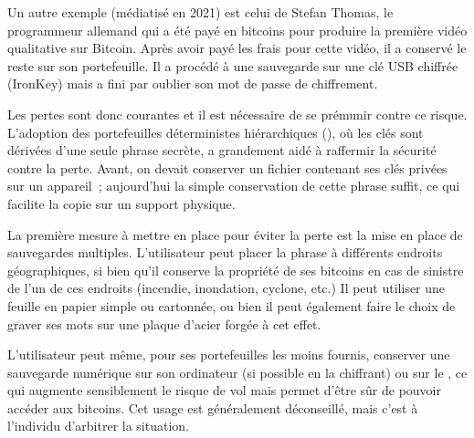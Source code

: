 Un autre exemple (médiatisé en 2021) est celui de Stefan Thomas, le programmeur allemand qui a été payé en bitcoins pour produire la première vidéo qualitative sur Bitcoin. Après avoir payé les frais pour cette vidéo, il a conservé le reste sur son portefeuille. Il a procédé à une sauvegarde sur une clé USB chiffrée (IronKey) mais a fini par oublier son mot de passe de chiffrement.


Les pertes sont donc courantes et il est nécessaire de se prémunir contre ce risque. L'adoption des portefeuilles déterministes hiérarchiques (), où les clés sont dérivées d'une seule phrase secrète, a grandement aidé à raffermir la sécurité contre la perte. Avant, on devait conserver un fichier contenant ses clés privées sur un appareil~; aujourd'hui la simple conservation de cette phrase suffit, ce qui facilite la copie sur un support physique.

La première mesure à mettre en place pour éviter la perte est la mise en place de sauvegardes multiples. L'utilisateur peut placer la phrase à différents endroits géographiques, si bien qu'il conserve la propriété de ses bitcoins en cas de sinistre de l'un de ces endroits (incendie, inondation, cyclone, etc.)  Il peut utiliser une feuille en papier simple ou cartonnée, ou bien il peut également faire le choix de graver ses mots sur une plaque d'acier forgée à cet effet.

L'utilisateur peut même, pour ses portefeuilles les moins fournis, conserver une sauvegarde numérique sur son ordinateur (si possible en la chiffrant) ou sur le , ce qui augmente sensiblement le risque de vol mais permet d'être sûr de pouvoir accéder aux bitcoins. Cet usage est généralement déconseillé, mais c'est à l'individu d'arbitrer la situation.


